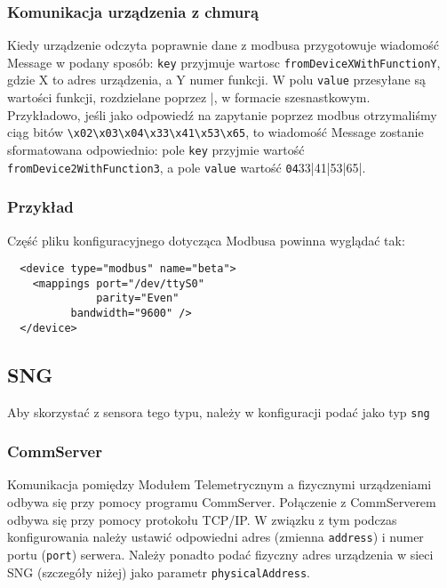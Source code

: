 \documentclass[11pt]{article}
\begin{document}
\subsubsection{Komunikacja urządzenia z chmurą}
Kiedy urządzenie odczyta poprawnie dane z modbusa przygotowuje wiadomość Message w podany sposób: 
\verb|key| przyjmuje wartosc \verb|fromDeviceXWithFunctionY|, gdzie X to adres urządzenia, a Y numer funkcji.
W polu \verb|value| przesyłane są wartości funkcji, rozdzielane poprzez |, w formacie szesnastkowym. \\
Przykładowo, jeśli jako odpowiedź na zapytanie poprzez modbus otrzymaliśmy ciąg bitów \verb|\x02\x03\x04\x33\x41\x53\x65|, to
wiadomość Message zostanie sformatowana odpowiednio: pole \verb|key| przyjmie wartość \verb|fromDevice2WithFunction3|, a pole
\verb|value| wartość \verb|04|33|41|53|65|. 


\subsubsection{Przykład}
Część pliku konfiguracyjnego dotycząca Modbusa powinna wyglądać tak:
\begin{verbatim}
  <device type="modbus" name="beta">
    <mappings port="/dev/ttyS0"
              parity="Even"
	      bandwidth="9600" />
  </device>
\end{verbatim}


\subsection{SNG}
Aby skorzystać z sensora tego typu, należy w konfiguracji podać jako typ \verb|sng|
\subsubsection{CommServer}
Komunikacja pomiędzy Modułem Telemetrycznym a fizycznymi urządzeniami odbywa się przy pomocy
programu CommServer. Połączenie z CommServerem odbywa się przy pomocy protokołu TCP/IP.
W związku z tym podczas konfigurowania należy ustawić odpowiedni adres (zmienna \verb|address|)
i numer portu (\verb|port|) serwera. Należy ponadto podać fizyczny adres urządzenia w sieci 
SNG (szczegóły niżej) jako parametr \verb|physicalAddress|.
\end{document}
